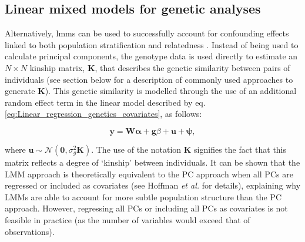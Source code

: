 \subsection{Linear mixed models for genetic analyses}
\label{sec:LMM}

Alternatively, \gls{lmm}s can be used to successfully account for confounding effects linked to both population stratification and relatedness 
\cite{yu2006unified, kang2008efficient,kang2010variance, price2010new, zhou2012genome, lee2018genome}.
Instead of being used to calculate principal components, the genotype data is used directly to estimate an $N \times N$ kinship matrix, $\mathbf{K}$, that describes the genetic similarity between pairs of individuals (see section below for a description of commonly used approaches to generate $\mathbf{K}$). 
This genetic similarity is modelled through the use of an additional random effect term in the linear model described by eq. \eqref{eq:Linear_regression_genetics_covariates}, as follows:

\begin{equation}\label{eq:Linear_mixed_model}
 \mathbf{y} =  \mathbf{W}\boldsymbol{\alpha} + \mathbf{g}\beta + \mathbf{u} + \boldsymbol{\psi}, 
\end{equation}

where $\mathbf{u} \sim \mathcal{N}(\mathbf{0}, \sigma_g^2\mathbf{K})$.
The use of the notation $\mathbf{K}$ signifies the fact that this matrix reflects a degree of `kinship' between individuals. 
It can be shown that the LMM approach is theoretically equivalent to the PC
approach when all PCs are regressed or included as covariates (see Hoffman \textit{et al.} \cite{hoffman2013correcting} for details), explaining why LMMs are able to account for more subtle population structure than the PC approach. 
However, regressing all PCs or including all PCs as covariates is not feasible in practice (as the number of variables would exceed that of observations). 




